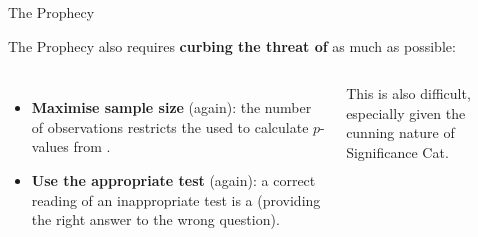 \documentclass{beamer}
\begin{document}
	\begin{frame}[t]{The Prophecy}

	The Prophecy also requires \textbf{curbing the threat of } as much as possible:
	
	\begin{columns}[T]
		\begin{itemize}
 			\item \textbf{Maximise sample size} (again): the number of observations restricts the  used to calculate $p$-values from .

 			\item \textbf{Use the appropriate test} (again): a correct reading of an inappropriate test is a  (providing the right answer to the wrong question).
		\end{itemize}

	This is also difficult, especially given the cunning nature of Significance Cat.	


\end{columns}
\end{frame}
\end{document}
